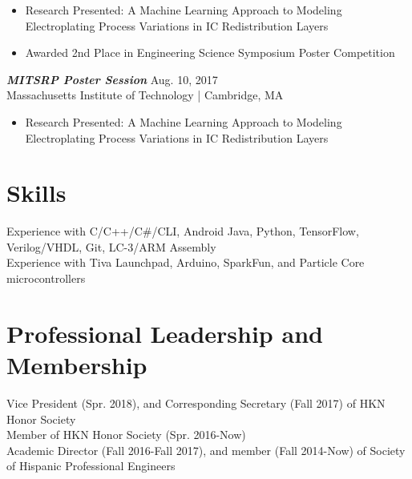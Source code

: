 \documentclass[letter]{res}
\begin{document}
\begin{resume}
 \vspace{-4mm}
    
 \begin{itemize}
 \item Research Presented: A Machine Learning Approach to Modeling Electroplating Process Variations in IC Redistribution Layers
 \item Awarded 2nd Place in Engineering Science Symposium Poster Competition
 \end{itemize}
 
\vspace{-2mm}

{\sl \textbf{MITSRP Poster Session}} \hfill Aug. 10, 2017\\
Massachusetts Institute of Technology | Cambridge, MA\newline

 \vspace{-4mm}
 
\begin{itemize}
 \item Research Presented: A Machine Learning Approach to Modeling Electroplating Process Variations in IC Redistribution Layers
 \end{itemize}

\vspace{-4mm}
 
\section{Skills}
Experience with C/C++/C\#/CLI, Android Java, Python, TensorFlow, Verilog/VHDL, Git, LC-3/ARM Assembly\\
Experience with Tiva Launchpad, Arduino, SparkFun, and Particle Core microcontrollers\\

\vspace{-8mm}

\section{Professional Leadership and Membership}
Vice President (Spr. 2018), and Corresponding Secretary (Fall 2017) of HKN Honor Society\\
Member of HKN Honor Society (Spr. 2016-Now)\\
Academic Director (Fall 2016-Fall 2017), and member (Fall 2014-Now) of Society of Hispanic Professional Engineers\\


\end{resume}
\end{document}
